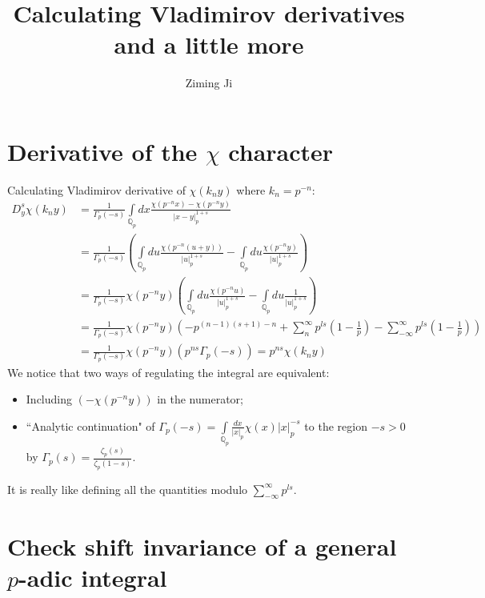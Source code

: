 \documentclass[12pt]{article}
\begin{document}
 
\title{Calculating Vladimirov derivatives and a little more}
\author{Ziming Ji}
 
\maketitle
 
\section{Derivative of the $\chi$ character}
Calculating Vladimirov derivative of $\chi(k_ny)$ where $k_n=p^{-n}$:
\begin{equation}
\begin{aligned}
D^s_y \chi(k_n y)&=\frac{1}{\Gamma_p (-s)} \int\limits _{\mathbb{Q}_p}dx \frac{\chi( p^{-n} x) - \chi( p^{-n}y)}{|x-y|_p^{1+s}}\\
&=\frac{1}{\Gamma_p (-s)} \left(\int\limits _{\mathbb{Q}_p}du \frac{\chi( p^{-n} (u+y))}{|u|_p^{1+s}}-\int\limits _{\mathbb{Q}_p}du \frac{\chi( p^{-n} y)}{|u|_p^{1+s}}\right)\\
&=\frac{1}{\Gamma_p (-s)} \chi( p^{-n} y)\left(\int\limits _{\mathbb{Q}_p}du \frac{\chi( p^{-n} u)}{|u|_p^{1+s}}-\int\limits _{\mathbb{Q}_p}du \frac{1}{|u|_p^{1+s}}\right)\\
&=\frac{1}{\Gamma_p (-s)} \chi( p^{-n} y)\left(-p^{(n-1)(s+1)-n}+\sum\limits_n^\infty p^{ls}(1-\frac{1}{p})-\sum\limits_{-\infty}^\infty p^{ls}(1-\frac{1}{p})\right)\\
&=\frac{1}{\Gamma_p (-s)} \chi( p^{-n} y)\left(p^{ns}\Gamma_p(-s)\right)=p^{ns}\chi(k_n y)
\end{aligned}
\end{equation}
We notice that two ways of regulating the integral are equivalent:
\begin{itemize}
\item Including $(- \chi( p^{-n}y))$ in the numerator;
\item ``Analytic continuation" of $\Gamma_p(-s)=\int\limits_{\mathbb{Q}_p}\frac{dx}{|x|_p}\chi(x)|x|_p^{-s}$ to the region $-s>0$ by $\Gamma_p(s)=\frac{\zeta_p(s)}{\zeta_p(1-s)}$.
\end{itemize}
It is really like defining all the quantities modulo $\sum\limits_{-\infty}^\infty p^{ls}$.
\section{Check shift invariance of a general $p$-adic integral}
\end{document}
